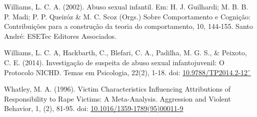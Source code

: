 \hangindent=25pt
\noindent Williams, L. C. A. (2002). Abuso sexual infantil. Em: H. J. Guilhardi; M. B. B. P. Madi; P. P. Queiróz \& M. C. Scoz (Orgs.) Sobre Comportamento e Cognição: Contribuições para a construção da teoria do comportamento, 10, 144-155. Santo André: ESETec Editores Associados.

\hangindent=25pt
\noindent Williams, L. C. A, Hackbarth, C., Blefari, C. A., Padilha, M. G. S., \& Peixoto, C. E. (2014). Investigação de suspeita de abuso sexual infantojuvenil: O Protocolo NICHD. Temas em Psicologia, 22(2), 1-18. doi: \url{10.9788/TP2014.2-12`}

\hangindent=25pt
\noindent Whatley, M. A. (1996). Victim Characteristics Influencing Attributions of Responsibility to Rape Victims: A Meta-Analysis. Aggression and Violent Behavior, 1, (2), 81-95. doi: \url{10.1016/1359-1789(95)00011-9}

